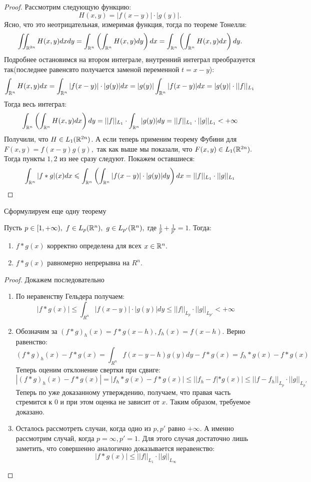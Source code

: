 \begin{proof}
    Рассмотрим следующую функцию:
    $$H(x, y) = |f(x - y)| \cdot |g(y)|.$$
    Ясно, что это неотрицательная, измеримая функция, тогда по теореме Тонелли:
    $$\iint_{\mathbb{R}^{2n}}H(x, y) dx dy = \int_{\mathbb{R}^n}\left( \int_{\mathbb{R}^n} H(x, y) dy\right) dx = \int_{\mathbb{R}^n}\left( \int_{\mathbb{R}^n} H(x, y) dx\right) dy.$$
    Подробнее остановимся на втором интеграле, внутренний интеграл преобразуется так(последнее равенсвто получается заменой переменной $t = x-y$):
    $$\int_{\mathbb{R}^n} H(x, y) dx = \int_{\mathbb{R}^n} |f(x - y)| \cdot |g(y)| dx = |g(y)| \int_{\mathbb{R}^n}|f(x - y)|dx = |g(y)| \cdot ||f||_{L_1}$$
    Тогда весь интеграл:
    $$ \int_{\mathbb{R}^n}\left( \int_{\mathbb{R}^n} H(x, y) dx\right) dy = ||f||_{L_1} \cdot  \int_{\mathbb{R}^n} |g(y)| dy = ||f||_{L_1} \cdot ||g||_{L_1} < + \infty$$
    Получили, что $H \in L_1(\mathbb{R}^{2n})$. А если теперь применим теорему Фубини для $F(x, y) = f(x - y) g(y),$ так как выше мы показали, что $F(x, y) \in L_1(\mathbb{R}^{2n}).$ Тогда пункты $1, 2$ из нее сразу следуют. Покажем оставшиеся:
    $$\int_{\mathbb{R}^n}|f*g|(x) dx \leqslant \int_{\mathbb{R}^n}\left( \int_{\mathbb{R}^n} |f(x - y)| \cdot |g(y)| dy \right) dx = ||f||_{L_1} \cdot ||g||_{L_1}$$
\end{proof}

Сформулируем еще одну теорему

\begin{theorem}
    Пусть $p \in [1, +\infty), \ f \in L_p(\mathbb{R}^n), \ g \in L_{p'}(\mathbb{R}^n), $ где $\frac{1}{p} + \frac{1}{p'} = 1.$ Тогда:
    \begin{enumerate}
        \item $f * g(x)$ корректно определена для всех $x \in \mathbb{R}^n.$
        \item $f * g(x)$ равномерно непрерывна на $R^n.$
    \end{enumerate}
\end{theorem}

\begin{proof}
Докажем последовательно
    \begin{enumerate}
        \item По неравенству Гельдера получаем:
        $$|f * g(x)| \leq \int_{R^n}|f(x - y)| \cdot |g(y)| dy \leq ||f||_{L_p} \cdot ||g||_{L_{p
        '}} < + \infty$$
        \item Обозначим за $(f * g)_h(x) = f * g(x - h), f_h(x) = f(x -h).$ Верно равенство:
        $$(f * g)_h(x) - f * g(x) = \int_{R^n} f(x - y -h) g(y)dy - f*g(x) = f_h * g(x) - f*g(x)$$
        Теперь оценим отклонение свертки при сдвиге:
        $$|(f * g)_h(x) - f * g(x)| = |f_h * g(x) - f*g(x)| \leq ||f_h - f| * g(x)| \leq ||f-f_h||_{L_p} \cdot ||g ||_{L_p'}$$
        Теперь по уже доказанному утверждению,  получаем, что правая часть стремится к $0$ и при этом оценка не зависит от $x.$ Таким образом, требуемое доказано.
        \item Осталось рассмотреть случаи, когда одно из $p, p'$ равно $+\infty.$ А именно рассмотрим случай, когда $p = \infty, p' = 1.$ Для этого случая достаточно лишь заметить, что совершенно аналогично доказывается неравенство:
        $$|f * g(x)| \leq ||f||_{L_1} \cdot ||g||_{L_{\infty}}$$
    \end{enumerate}
\end{proof}

